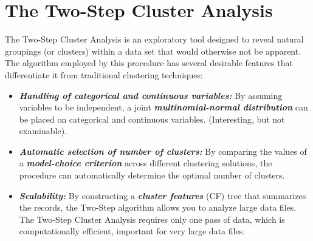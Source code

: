 \documentclass[a4paper,12pt]{article}
\begin{document}
\section{The Two-Step Cluster Analysis}
The Two-Step Cluster Analysis is an exploratory tool designed to reveal natural groupings (or clusters) within a data set that would otherwise not be apparent. The algorithm employed by this procedure has several desirable features that differentiate it from traditional clustering techniques:

\begin{itemize}
	\item \textbf{\textit{Handling of categorical and continuous variables:}} By assuming variables to be independent, a joint \textbf{\textit{multinomial-normal distribution}} can be placed on categorical and continuous variables. (Interesting, but not examinable).
	
	\item \textbf{\textit{Automatic selection of number of clusters:}} By comparing the values of a \textbf{\textit{model-choice criterion}} across different clustering solutions, the procedure can automatically determine the optimal number of clusters.
	
	\item \textbf{\textit{Scalability:}} By constructing a \textbf{\textit{cluster features}} (CF) tree that summarizes the records, the Two-Step algorithm allows you to analyze large data files.\\ The Two-Step Cluster Analysis requires only one pass of data, which is computationally efficient, important for very large data files.
	
\end{itemize}
\end{document}
